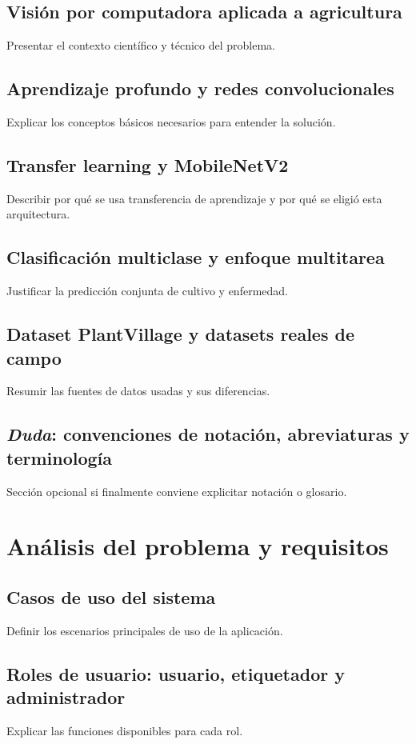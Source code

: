\documentclass[11pt,spanish,listoffigures,listoftables]{tfgetsinf}
\begin{document}
\section{Visión por computadora aplicada a agricultura}
Presentar el contexto científico y técnico del problema.

\section{Aprendizaje profundo y redes convolucionales}
Explicar los conceptos básicos necesarios para entender la solución.

\section{Transfer learning y MobileNetV2}
Describir por qué se usa transferencia de aprendizaje y por qué se eligió esta arquitectura.

\section{Clasificación multiclase y enfoque multitarea}
Justificar la predicción conjunta de cultivo y enfermedad.

\section{Dataset PlantVillage y datasets reales de campo}
Resumir las fuentes de datos usadas y sus diferencias.

\section{\textit{Duda}: convenciones de notación, abreviaturas y terminología}
Sección opcional si finalmente conviene explicitar notación o glosario.

\chapter{Análisis del problema y requisitos}
\section{Casos de uso del sistema}
Definir los escenarios principales de uso de la aplicación.

\section{Roles de usuario: usuario, etiquetador y administrador}
Explicar las funciones disponibles para cada rol.
\end{document}
